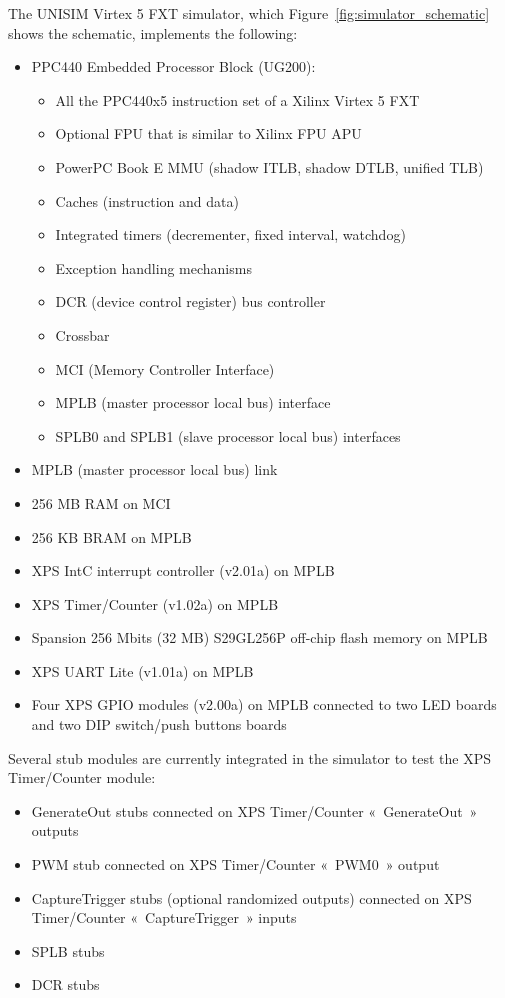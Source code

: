 \noindent The UNISIM Virtex 5 FXT simulator, which Figure~\ref{fig:simulator_schematic} shows the schematic, implements the following:
\begin{itemize}
	\item PPC440 Embedded Processor Block (UG200):
		\begin{itemize}
			\item All the PPC440x5 \cite{PPC440x5} instruction set of a Xilinx Virtex 5 FXT
			\item Optional FPU that is similar to Xilinx FPU APU \cite{APU_FPU}
			\item PowerPC Book E MMU (shadow ITLB, shadow DTLB, unified TLB)
			\item Caches (instruction and data)
			\item Integrated timers (decrementer, fixed interval, watchdog)
			\item Exception handling mechanisms
			\item DCR (device control register) bus controller
			\item Crossbar
			\item MCI (Memory Controller Interface)
			\item MPLB (master processor local bus) interface
			\item SPLB0 and SPLB1 (slave processor local bus) interfaces
		\end{itemize}
	\item MPLB (master processor local bus) link
	\item 256 MB RAM on MCI
	\item 256 KB BRAM on MPLB
	\item XPS IntC interrupt controller (v2.01a) \cite{XPS_INTC} on MPLB
	\item XPS Timer/Counter (v1.02a) \cite{XPS_TIMER_COUNTER} on MPLB
	\item Spansion 256 Mbits (32 MB) S29GL256P off-chip flash memory \cite{S29GLP} on MPLB
	\item XPS UART Lite (v1.01a) \cite{XPS_UART_LITE} on MPLB
	\item Four XPS GPIO modules (v2.00a) \cite{XPS_GPIO} on MPLB connected to two LED boards and two DIP switch/push buttons boards
\end{itemize}

\noindent Several stub modules are currently integrated in the simulator to test the XPS Timer/Counter module:
\begin{itemize}
\item GenerateOut stubs connected on XPS Timer/Counter « GenerateOut » outputs
\item PWM stub connected on XPS Timer/Counter « PWM0 » output
\item CaptureTrigger stubs (optional randomized outputs) connected on XPS Timer/Counter « CaptureTrigger » inputs
\item SPLB stubs
\item DCR stubs
\end{itemize}

